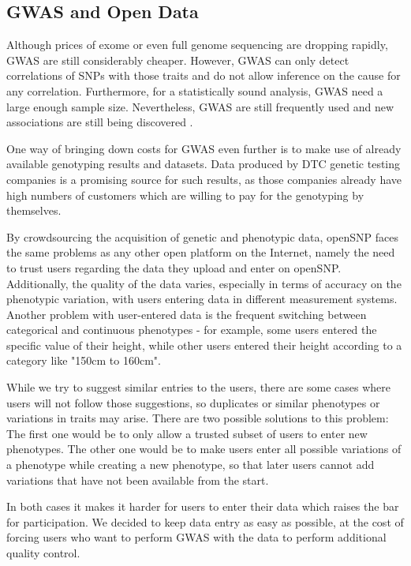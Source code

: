 \documentclass[10pt]{article}
\begin{document}
\subsection*{GWAS and Open Data}
Although prices of exome or even full genome sequencing are dropping rapidly, GWAS are still considerably cheaper. However, GWAS can only detect correlations of SNPs with those traits and do not allow 
inference on the cause for any correlation. Furthermore, for a statistically sound analysis, GWAS need a large enough sample size. Nevertheless, GWAS are still frequently used and new associations are still being discovered \cite{10.1371.journal.pone.0031470,10.1371.journal.pone.0030309,10.1371.journal.pone.0029848}. 

One way of bringing down costs for GWAS even further is to make use of already available genotyping results and datasets. 
Data produced by DTC genetic testing companies is a promising source for such results, as those companies already have high 
numbers of customers which are willing to pay for the genotyping by themselves.

By crowdsourcing the acquisition of genetic and phenotypic data, openSNP faces the same problems as any other 
open platform on the Internet, namely the need to trust users regarding the data they upload and enter on openSNP. 
Additionally, the quality of the data varies, especially in terms of accuracy on the phenotypic variation, 
with users entering data in different measurement systems. Another problem with user-entered data is the frequent switching between categorical and continuous phenotypes - for example, some users entered the specific value of their height, while other users entered their height according to a category like "150cm to 160cm". 

While we try to suggest similar entries to the users, 
there are some cases where users will not follow those suggestions, so duplicates or similar phenotypes or variations in traits may arise. There are two possible solutions to this problem: The first one would be to only allow a trusted subset of users to enter new phenotypes. The other one 
would be to make users enter all possible variations of a phenotype while creating a new phenotype, so that later users cannot add 
variations that have not been available from the start. 

In both cases it makes it harder 
for users to enter their data which raises the bar for participation.
We decided to keep data entry as easy as possible, at the cost of forcing users who want to perform GWAS with the data to perform additional quality control.
\end{document}
